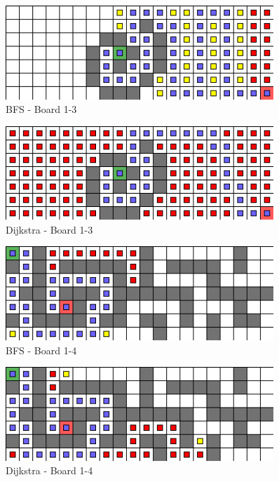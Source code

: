 \documentclass{article}
\begin{document}
	\begin{figure}[!htb]
		\caption{BFS - Board 1-3}
		\includegraphics[width=0.9\textwidth]{Bfs1-3.png}
	\end{figure}
	\begin{figure}[!htb]
		\caption{Dijkstra - Board 1-3}
		\includegraphics[width=0.9\textwidth]{Dijkstra-1-3.png}
	\end{figure}


	\begin{figure}[!htb]
		\caption{BFS - Board 1-4}
		\includegraphics[width=0.9\textwidth]{Bfs1-4.png}
	\end{figure}
	\begin{figure}[!htb]
		\caption{Dijkstra - Board 1-4}
		\includegraphics[width=0.9\textwidth]{Dijkstra-1-4.png}
	\end{figure}
\end{document}
